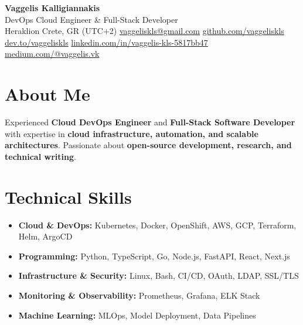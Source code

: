 \documentclass[a4paper,10pt]{article}
\begin{document}
\pagestyle{empty}

\begin{center}
    {\huge \textbf{Vaggelis Kalligiannakis} } \\
    \vspace{7pt}
    {\large DevOps Cloud Engineer \& Full-Stack Developer} \\
    \vspace{7pt}
     Heraklion Crete, GR (UTC+2) \quad
     \href{mailto:vaggeliskls@gmail.com}{vaggeliskls@gmail.com} \quad
     \href{https://github.com/vaggeliskls}{github.com/vaggeliskls} \quad
     \href{https://dev.to/vaggeliskls}{dev.to/vaggeliskls} \quad
     \href{https://www.linkedin.com/in/vaggelis-kls-5817bb47/}{linkedin.com/in/vaggelis-kls-5817bb47} \quad
     \href{https://medium.com/@vaggelis.vk}{medium.com/@vaggelis.vk}
\end{center}

\vspace{4pt}

\section*{ About Me}
Experienced \textbf{Cloud DevOps Engineer} and \textbf{Full-Stack Software Developer} with expertise in \textbf{cloud infrastructure, automation, and scalable architectures}.  
Passionate about \textbf{open-source development, research, and technical writing}.

\vspace{2pt}

\section*{ Technical Skills}
\begin{itemize}[left=0pt, label=]
    \item \textbf{Cloud \& DevOps:} Kubernetes, Docker, OpenShift, AWS, GCP, Terraform, Helm, ArgoCD
\end{itemize}
\begin{itemize}[left=0pt, label=]
    \item \textbf{Programming:} Python, TypeScript, Go, Node.js, FastAPI, React, Next.js
\end{itemize}
\begin{itemize}[left=0pt, label=]
    \item \textbf{Infrastructure \& Security:} Linux, Bash, CI/CD, OAuth, LDAP, SSL/TLS
\end{itemize}
\begin{itemize}[left=0pt, label=]
    \item \textbf{Monitoring \& Observability:} Prometheus, Grafana, ELK Stack
\end{itemize}
\begin{itemize}[left=0pt, label=]
    \item \textbf{Machine Learning:} MLOps, Model Deployment, Data Pipelines
\end{itemize}
\end{document}
